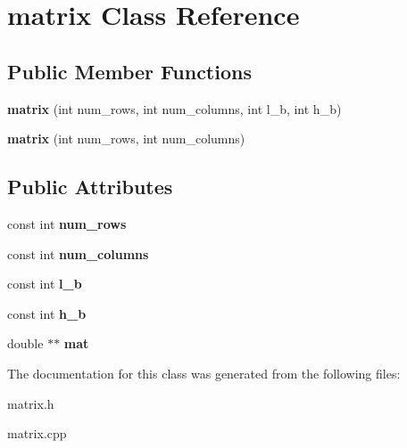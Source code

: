 \hypertarget{classmatrix}{}\section{matrix Class Reference}
\label{classmatrix}
\subsection*{Public Member Functions}
\begin{DoxyCompactItemize}
\item 
\mbox{\label{classmatrix_a2bb2708893087ffb98618c212952dc5e}} 
{\bfseries matrix} (int num\+\_\+rows, int num\+\_\+columns, int l\+\_\+b, int h\+\_\+b)
\item 
\mbox{\label{classmatrix_a727e1cc8355266864b5adf7cb60f5eb0}} 
{\bfseries matrix} (int num\+\_\+rows, int num\+\_\+columns)
\end{DoxyCompactItemize}
\subsection*{Public Attributes}
\begin{DoxyCompactItemize}
\item 
\mbox{\label{classmatrix_a74723e43616696694c630f5a2417e0c2}} 
const int {\bfseries num\+\_\+rows}
\item 
\mbox{\label{classmatrix_a438b799a1055911f085df3aba2f9f5cb}} 
const int {\bfseries num\+\_\+columns}
\item 
\mbox{\label{classmatrix_af8cc7e1cf5ae36cdc7b48dbec2f6a626}} 
const int {\bfseries l\+\_\+b}
\item 
\mbox{\label{classmatrix_a177e57b98003ce6e837dda891c726e84}} 
const int {\bfseries h\+\_\+b}
\item 
\mbox{\label{classmatrix_aa5caffe4dd09d17b93eeb64113b1c8f8}} 
double $\ast$$\ast$ {\bfseries mat}
\end{DoxyCompactItemize}


The documentation for this class was generated from the following files\+:\begin{DoxyCompactItemize}
\item 
matrix.\+h\item 
matrix.\+cpp\end{DoxyCompactItemize}
